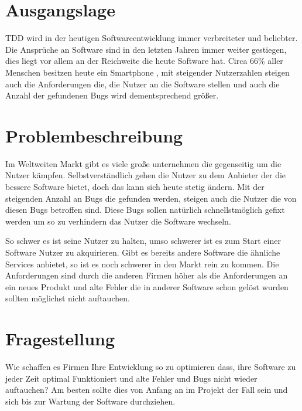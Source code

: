 \section{Ausgangslage}
TDD wird in der heutigen Softwareentwicklung immer verbreiteter und beliebter.
Die Ansprüche an Software sind in den letzten Jahren immer weiter gestiegen, dies
liegt vor allem an der Reichweite die heute Software hat. Circa 66\% aller Menschen
besitzen heute ein Smartphone \cite{FraukeSchobelt:Smartphone}, mit steigender
Nutzerzahlen steigen auch die Anforderungen die, die Nutzer an die Software stellen
und auch die Anzahl der gefundenen Bugs wird dementsprechend größer.



\section{Problembeschreibung}
Im Weltweiten Markt gibt es viele große unternehmen die gegenseitig um die
Nutzer kämpfen. Selbstverständlich gehen die Nutzer zu dem Anbieter der die bessere
Software bietet, doch das kann sich heute stetig ändern. Mit der steigenden Anzahl
an Bugs die gefunden werden, steigen auch die Nutzer die von diesen Bugs betroffen
sind. Diese Bugs sollen natürlich schnellstmöglich gefixt werden um so zu verhindern
das Nutzer die Software wechseln.

So schwer es ist seine Nutzer zu halten, umso schwerer ist es zum Start einer Software
Nutzer zu akquirieren. Gibt es bereits andere Software die ähnliche Services anbietet,
so ist es noch schwerer in den Markt rein zu kommen. Die Anforderungen sind durch die
anderen Firmen höher als die Anforderungen an ein neues Produkt und alte Fehler die
in anderer Software schon gelöst wurden sollten möglichst nicht auftauchen.

\section{Fragestellung}
Wie schaffen es Firmen Ihre Entwicklung so zu optimieren dass, ihre Software zu jeder
Zeit optimal Funktioniert und alte Fehler und Bugs nicht wieder auftauchen? Am besten
sollte dies von Anfang an im Projekt der Fall sein und sich bis zur Wartung der Software
durchziehen.
